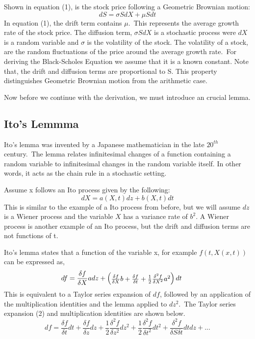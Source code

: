 \documentclass[11pt]{article}
\begin{document}
Shown in equation (1), is the stock price following a Geometric Brownian motion:
\begin{equation}
dS = \sigma S dX + \mu S dt 
\end{equation}
In equation (1), the drift term contains $\mu $.\ This represents the average growth rate of the stock price. The diffusion term, $\sigma S dX$ is a stochastic process were $dX$ is a random variable and $\sigma$ is the volatility of the stock. The volatility of a stock, are the random fluctuations of the price around the average growth rate.\ For deriving the Black-Scholes Equation we assume that it is a known constant. Note that, the drift and diffusion terms are proportional to S. This property distinguishes Geometric Brownian motion from the arithmetic case.

Now before we continue with the derivation, we must introduce an crucial lemma.

\subsection{Ito's Lemmma}
Ito's lemma was invented by a Japanese mathematician in the late $20^{th}$century.\
The lemma relates infinitesimal changes of a function containing a random variable to infinitesimal changes in the random variable itself. In other words, it acts as the chain rule in a stochastic setting.

Assume x follows an Ito process given by the following:
\begin{equation*}
dX = a(X,t)dz + b(X,t)dt 
\end{equation*}
This is similar to the example of a Ito process from before, but we will assume $dz$ is a Wiener process and the variable $X$ has a variance rate of $b^2$. A Wiener process is another example of an Ito process, but the drift and diffusion terms are not functions of t.

Ito's lemma states that a function of the variable x, for example $f(t,X(x,t))$ can be expressed as,
\begin{equation*}
df = \frac{\delta f}{\delta X}adz + 
\setlength{\arraycolsep}{2pt}\begin{pmatrix} \frac{\delta f}{\delta X}b + \frac{\delta f}{\delta t} + \frac{1}{2}\frac{\delta^2 f}{\delta X^2}a^2\end{pmatrix}dt\phantom{cccc}
\end{equation*}
This is equivalent to a Taylor series expansion of $df$, followed by an application of the multiplication identities and the lemma applied to $dz^2$.\ The Taylor series expansion (2) and multiplication identities are shown below.
\begin{equation}
df = \frac{\delta f}{\delta t}dt + \frac{\delta f}{\delta z}dz + \frac{1}{2}\frac{\delta^2 f}{\delta z^2}dz^2
+\frac{1}{2}\frac{\delta^2 f}{\delta t^2}dt^2 + \frac{\delta^2 f}{\delta S \delta t}dtdz + ...
\end{equation}
\end{document}
